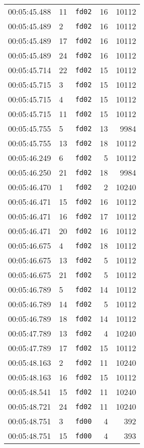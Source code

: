\documentclass{article}
\begin{document}
\begin{longtable}{lllrr}
00:05:45.488 & 11 & \texttt{fd02} & 16 & 10112 \\
00:05:45.489 & 2 & \texttt{fd02} & 16 & 10112 \\
00:05:45.489 & 17 & \texttt{fd02} & 16 & 10112 \\
00:05:45.489 & 24 & \texttt{fd02} & 16 & 10112 \\
00:05:45.714 & 22 & \texttt{fd02} & 15 & 10112 \\
00:05:45.715 & 3 & \texttt{fd02} & 15 & 10112 \\
00:05:45.715 & 4 & \texttt{fd02} & 15 & 10112 \\
00:05:45.715 & 11 & \texttt{fd02} & 15 & 10112 \\
00:05:45.755 & 5 & \texttt{fd02} & 13 & 9984 \\
00:05:45.755 & 13 & \texttt{fd02} & 18 & 10112 \\
00:05:46.249 & 6 & \texttt{fd02} & 5 & 10112 \\
00:05:46.250 & 21 & \texttt{fd02} & 18 & 9984 \\
00:05:46.470 & 1 & \texttt{fd02} & 2 & 10240 \\
00:05:46.471 & 15 & \texttt{fd02} & 16 & 10112 \\
00:05:46.471 & 16 & \texttt{fd02} & 17 & 10112 \\
00:05:46.471 & 20 & \texttt{fd02} & 16 & 10112 \\
00:05:46.675 & 4 & \texttt{fd02} & 18 & 10112 \\
00:05:46.675 & 13 & \texttt{fd02} & 5 & 10112 \\
00:05:46.675 & 21 & \texttt{fd02} & 5 & 10112 \\
00:05:46.789 & 5 & \texttt{fd02} & 14 & 10112 \\
00:05:46.789 & 14 & \texttt{fd02} & 5 & 10112 \\
00:05:46.789 & 18 & \texttt{fd02} & 14 & 10112 \\
00:05:47.789 & 13 & \texttt{fd02} & 4 & 10240 \\
00:05:47.789 & 17 & \texttt{fd02} & 15 & 10112 \\
00:05:48.163 & 2 & \texttt{fd02} & 11 & 10240 \\
00:05:48.163 & 16 & \texttt{fd02} & 15 & 10112 \\
00:05:48.541 & 15 & \texttt{fd02} & 11 & 10240 \\
00:05:48.721 & 24 & \texttt{fd02} & 11 & 10240 \\
00:05:48.751 & 3 & \texttt{fd00} & 4 & 392 \\
00:05:48.751 & 15 & \texttt{fd00} & 4 & 393 \\

\end{longtable}
\end{document}
